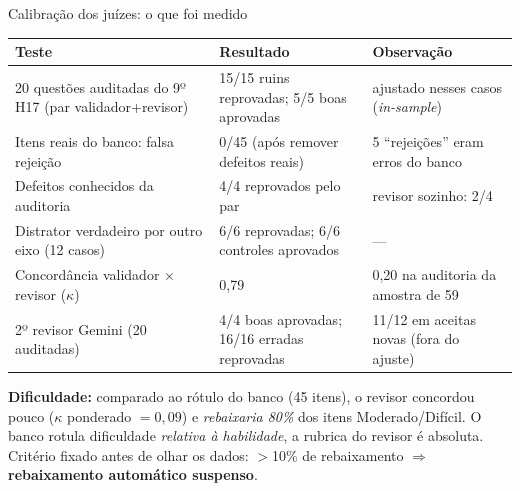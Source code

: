 \documentclass[aspectratio=169,11pt]{beamer}
\begin{document}
\begin{frame}{Calibração dos juízes: o que foi medido}
  \footnotesize
  \begin{tabularx}{\textwidth}{@{}p{} p{} X@{}}
    \toprule
    \textbf{Teste} & \textbf{Resultado} & \textbf{Observação} \\
    \midrule
    20 questões auditadas do 9º H17 (par validador+revisor)  & 15/15 ruins reprovadas; 5/5 boas aprovadas & ajustado nesses casos (\emph{in-sample}) \\
    Itens reais do banco: falsa rejeição                     & 0/45 (após remover defeitos reais)         & 5 ``rejeições'' eram erros do banco \\
    Defeitos conhecidos da auditoria                         & 4/4 reprovados pelo par                    & revisor sozinho: 2/4 \\
    Distrator verdadeiro por outro eixo (12 casos)           & 6/6 reprovadas; 6/6 controles aprovados    & --- \\
    Concordância validador $\times$ revisor ($\kappa$)       & 0,79                                       & 0,20 na auditoria da amostra de 59 \\
    2º revisor Gemini (20 auditadas)                         & 4/4 boas aprovadas; 16/16 erradas reprovadas & 11/12 em aceitas novas (fora do ajuste) \\
    \bottomrule
  \end{tabularx}

  \vspace{6pt}
  \begin{tcolorbox}[colback=lightblue, colframe=accentblue, boxrule=0.5pt, arc=2pt, left=5pt, right=5pt, top=2pt, bottom=2pt]
    \scriptsize \textbf{Dificuldade:} comparado ao rótulo do banco (45 itens), o revisor concordou pouco ($\kappa$ ponderado $=0{,}09$) e \emph{rebaixaria 80\%} dos itens Moderado/Difícil. O banco rotula dificuldade \emph{relativa à habilidade}, a rubrica do revisor é absoluta. Critério fixado antes de olhar os dados: $>$10\% de rebaixamento $\Rightarrow$ \textbf{rebaixamento automático suspenso}.
  \end{tcolorbox}
\end{frame}

\end{document}
